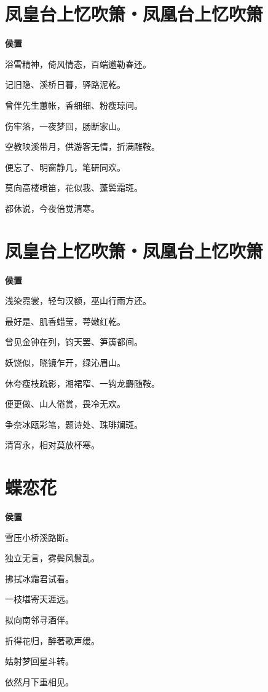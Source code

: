 \documentclass[12pt,a4paper]{ctexbook}
\begin{document}
\section{凤皇台上忆吹箫・凤凰台上忆吹箫}
\textbf{侯置}\par\vspace{0.5em}
浴雪精神，倚风情态，百端邀勒春还。\par
记旧隐、溪桥日暮，驿路泥乾。\par
曾伴先生蕙帐，香细细、粉瘦琼间。\par
伤牢落，一夜梦回，肠断家山。\par
空教映溪带月，供游客无情，折满雕鞍。\par
便忘了、明窗静几，笔研同欢。\par
莫向高楼喷笛，花似我、蓬鬓霜斑。\par
都休说，今夜倍觉清寒。\par

\section{凤皇台上忆吹箫・凤凰台上忆吹箫}
\textbf{侯置}\par\vspace{0.5em}
浅染霓裳，轻匀汉额，巫山行雨方还。\par
最好是、肌香蜡莹，萼嫩红乾。\par
曾见金钟在列，钧天罢、笋簴都间。\par
妖饶似，晓镜乍开，绿沁眉山。\par
休夸瘦枝疏影，湘裙窄、一钩龙麝随鞍。\par
便更做、山人倦赏，畏冷无欢。\par
争奈冰瓯彩笔，题诗处、珠琲斓斑。\par
清宵永，相对莫放杯寒。\par

\section{蝶恋花}
\textbf{侯置}\par\vspace{0.5em}
雪压小桥溪路断。\par
独立无言，雾鬓风鬟乱。\par
拂拭冰霜君试看。\par
一枝堪寄天涯远。\par
拟向南邻寻酒伴。\par
折得花归，醉著歌声缓。\par
姑射梦回星斗转。\par
依然月下重相见。\par
\end{document}
